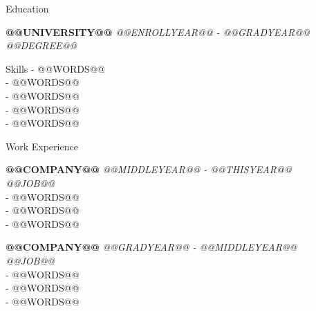 \documentclass{peppa_pig} %
\begin{document}

\begin{rSection}{Education}

{\bf @@UNIVERSITY@@ } \hfill {\em @@ENROLLYEAR@@ - @@GRADYEAR@@} 
\\{ \textit {@@DEGREE@@}} 

\end{rSection}

\begin{rSection}{Skills}
- @@WORDS@@\\
- @@WORDS@@\\
- @@WORDS@@\\
- @@WORDS@@\\
- @@WORDS@@\\
\end{rSection}


\begin{rSection}{Work Experience}

{\bf @@COMPANY@@} \hfill {\em @@MIDDLEYEAR@@ - @@THISYEAR@@} 
\\{\textit{@@JOB@@}}
\\- @@WORDS@@
\\- @@WORDS@@
\\- @@WORDS@@

{\bf @@COMPANY@@} \hfill {\em @@GRADYEAR@@ - @@MIDDLEYEAR@@} 
\\{\textit{@@JOB@@}}
\\- @@WORDS@@
\\- @@WORDS@@
\\- @@WORDS@@

\end{rSection}
\end{document}
